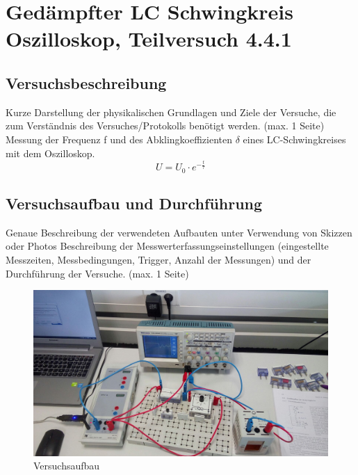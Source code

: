 \documentclass[12pt,a4paper]{article}
\author{Gruppe C14 \\ Julián Häck, Martin Koytek, Lars Wenning, Erik Zimmermann}
\begin{document}
\section{Gedämpfter LC Schwingkreis Oszilloskop, Teilversuch 4.4.1}
\subsection{Versuchsbeschreibung}
Kurze Darstellung der physikalischen Grundlagen und Ziele der Versuche, die zum Verständnis
des Versuches/Protokolls benötigt werden. (max. 1 Seite)
Messung der Frequenz f und des Abklingkoeffizienten $\delta$ eines LC-Schwingkreises mit dem Oszilloskop.
\begin{equation}
U=U_0\cdot e^{- \frac{t}{\tau}}
\end{equation}

\subsection{Versuchsaufbau und Durchführung}
Genaue Beschreibung der verwendeten Aufbauten unter Verwendung von Skizzen oder Photos
Beschreibung der Messwerterfassungseinstellungen (eingestellte Messzeiten, Messbedingungen,
Trigger, Anzahl der Messungen) und der Durchführung der Versuche. (max. 1 Seite)\newline

\begin{figure}[H]
\centering
\includegraphics[scale=0.27]{ArbeitsplatzE_1.jpg}
\caption{Versuchsaufbau}
\end{figure}
\end{document}
